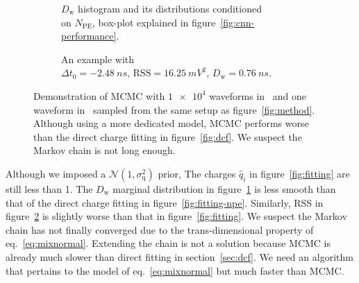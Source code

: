 \begin{figure}[H]
  \begin{subfigure}{.5\textwidth}
    \centering
    \resizebox{\textwidth}{!}{}
    \caption{\label{fig:mcmc-npe} $D_\mathrm{w}$ histogram and its distributions conditioned \\ on $N_{\mathrm{PE}}$, box-plot explained in figure~\ref{fig:cnn-performance}.}
  \end{subfigure}
  \begin{subfigure}{.5\textwidth}
    \centering
    \resizebox{\textwidth}{!}{}
    \caption{\label{fig:mcmc}An example with \\ $\Delta{t_0}=\SI{-2.48}{ns}$, $\mathrm{RSS}=\SI{16.25}{mV^2}$, $D_\mathrm{w}=\SI{0.76}{ns}$.}
  \end{subfigure}
  \caption{\label{fig:mcmc-performance}Demonstration of MCMC with $\num[retain-unity-mantissa=false]{1e4}$ waveforms in~ and one waveform in~ sampled from the same setup as figure~\ref{fig:method}.  Although using a more dedicated model, MCMC performs worse than the direct charge fitting in figure~\ref{fig:dcf}. We suspect the Markov chain is not long enough.}
\end{figure}
Although we imposed a $\mathcal{N}(1, \sigma_\mathrm{q}^2)$ prior, The charges $\hat{q}_i$ in figure~\ref{fig:fitting} are still less than 1.  The $D_\mathrm{w}$ marginal distribution in figure~\ref{fig:mcmc-npe} is less smooth than that of the direct charge fitting in figure~\ref{fig:fitting-npe}.  Similarly, RSS in figure~\ref{fig:mcmc} is slightly worse than that in figure~\ref{fig:fitting}.  We suspect the Markov chain has not finally converged due to the trans-dimensional property of eq.~\eqref{eq:mixnormal}.  Extending the chain is not a solution because MCMC is already much slower than direct fitting in section~\ref{sec:dcf}.  We need an algorithm that pertains to the model of eq.~\eqref{eq:mixnormal} but much faster than MCMC.

